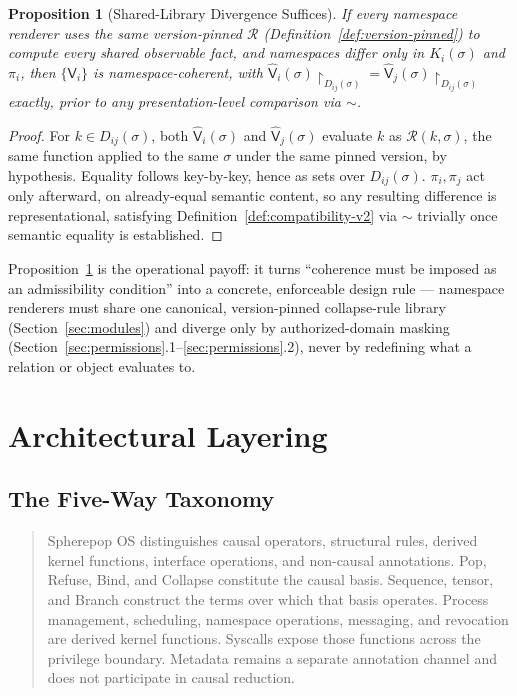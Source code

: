\documentclass[11pt]{article}
\newtheorem{proposition}{Proposition}[section]
\begin{document}
\begin{proposition}[Shared-Library Divergence Suffices]
\label{prop:shared-library-suffices}
If every namespace renderer uses the same version-pinned $\mathcal{R}$ (Definition~\ref{def:version-pinned}) to compute every shared observable fact, and namespaces differ only in $K_i(\sigma)$ and $\pi_i$, then $\{\mathsf{V}_i\}$ is namespace-coherent, with $\widehat{\mathsf{V}}_i(\sigma)\!\restriction_{D_{ij}(\sigma)} = \widehat{\mathsf{V}}_j(\sigma)\!\restriction_{D_{ij}(\sigma)}$ exactly, prior to any presentation-level comparison via $\sim$.
\end{proposition}
\begin{proof}
For $k \in D_{ij}(\sigma)$, both $\widehat{\mathsf{V}}_i(\sigma)$ and $\widehat{\mathsf{V}}_j(\sigma)$ evaluate $k$ as $\mathcal{R}(k,\sigma)$, the same function applied to the same $\sigma$ under the same pinned version, by hypothesis. Equality follows key-by-key, hence as sets over $D_{ij}(\sigma)$. $\pi_i, \pi_j$ act only afterward, on already-equal semantic content, so any resulting difference is representational, satisfying Definition~\ref{def:compatibility-v2} via $\sim$ trivially once semantic equality is established.
\end{proof}

Proposition~\ref{prop:shared-library-suffices} is the operational payoff: it turns ``coherence must be imposed as an admissibility condition'' into a concrete, enforceable design rule --- namespace renderers must share one canonical, version-pinned collapse-rule library (Section~\ref{sec:modules}) and diverge only by authorized-domain masking (Section~\ref{sec:permissions}.1--\ref{sec:permissions}.2), never by redefining what a relation or object evaluates to.

\section{Architectural Layering}
\label{sec:layering}

\subsection{The Five-Way Taxonomy}

\begin{quote}
Spherepop OS distinguishes causal operators, structural rules, derived kernel functions, interface operations, and non-causal annotations. Pop, Refuse, Bind, and Collapse constitute the causal basis. Sequence, tensor, and Branch construct the terms over which that basis operates. Process management, scheduling, namespace operations, messaging, and revocation are derived kernel functions. Syscalls expose those functions across the privilege boundary. Metadata remains a separate annotation channel and does not participate in causal reduction.
\end{quote}
\end{document}
